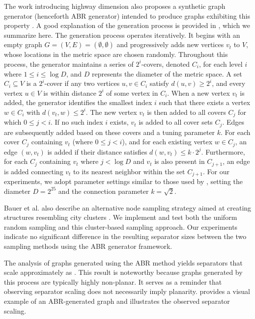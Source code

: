 The work introducing highway dimension also proposes a synthetic graph generator (henceforth ABR generator) intended to produce graphs exhibiting this property \cite{abraham_highway_2010}.
A good explanation of the generation process is provided in \cite{hutchison_synthetic_2010}, which we summarize here.
The generation process operates iteratively.
It begins with an empty graph \( G = (V, E) = (\emptyset, \emptyset) \) and progressively adds new vertices \(v_t\) to \(V\), whose locations in the metric space are chosen randomly.
Throughout this process, the generator maintains a series of \(2^i\)-covers, denoted \(C_i\), for each level \(i\) where \(1 \leq i \leq \log D\), and \(D\) represents the diameter of the metric space.
A set \(C_i \subseteq V\) is a \(2^i\)-cover if any two vertices \(u, v \in C_i\) satisfy \(d(u, v) \geq 2^i\), and every vertex \(u \in V\) is within distance \(2^i\) of some vertex in \(C_i\).
When a new vertex \(v_t\) is added, the generator identifies the smallest index \(i\) such that there exists a vertex \(w \in C_i\) with \(d(v_t, w) \leq 2^i\).
The new vertex \(v_t\) is then added to all covers \(C_j\) for which \(0 \leq j < i\).
If no such index \(i\) exists, \(v_t\) is added to all cover sets \(C_j\).
Edges are subsequently added based on these covers and a tuning parameter \(k\).
For each cover \(C_j\) containing \(v_t\) (where \(0 \leq j < i\)), and for each existing vertex \(w \in C_j\), an edge \((w, v_t)\) is added if their distance satisfies \(d(w, v_t) \leq k \cdot 2^j\).
Furthermore, for each \(C_j\) containing \(v_t\) where \(j < \log D\) and \(v_t\) is also present in \(C_{j+1}\), an edge is added connecting \(v_t\) to its nearest neighbor within the set \(C_{j+1}\).
For our experiments, we adopt parameter settings similar to those used by \cite{hutchison_synthetic_2010}, setting the diameter \(D = 2^{25}\) and the connection parameter \(k = \sqrt{2}\).

Bauer et al. also describe an alternative node sampling strategy aimed at creating structures resembling city clusters \cite{hutchison_synthetic_2010}.
We implement and test both the uniform random sampling and this cluster-based sampling approach.
Our experiments indicate no significant difference in the resulting separator sizes between the two sampling methods using the ABR generator framework.

The analysis of graphs generated using the ABR method yields separators that scale approximately as .
This result is noteworthy because graphs generated by this process are typically highly non-planar.
It serves as a reminder that observing  separator scaling does not necessarily imply planarity.
 provides a visual example of an ABR-generated graph and illustrates the observed separator scaling.

